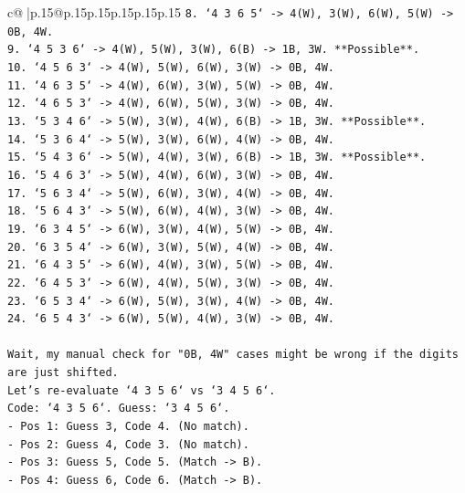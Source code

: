 \documentclass{article}
\begin{document}
{\begin{supertabular}{c@{$\;$}|p{.15\linewidth}@{}p{.15\linewidth}p{.15\linewidth}p{.15\linewidth}p{.15\linewidth}p{.15\linewidth}}
{{{\texttt{8. `4 3 6 5` {-}> 4(W), 3(W), 6(W), 5(W) {-}> 0B, 4W.} \\
\texttt{9. `4 5 3 6` {-}> 4(W), 5(W), 3(W), 6(B) {-}> 1B, 3W. **Possible**.} \\
\texttt{10. `4 5 6 3` {-}> 4(W), 5(W), 6(W), 3(W) {-}> 0B, 4W.} \\
\texttt{11. `4 6 3 5` {-}> 4(W), 6(W), 3(W), 5(W) {-}> 0B, 4W.} \\
\texttt{12. `4 6 5 3` {-}> 4(W), 6(W), 5(W), 3(W) {-}> 0B, 4W.} \\
\texttt{13. `5 3 4 6` {-}> 5(W), 3(W), 4(W), 6(B) {-}> 1B, 3W. **Possible**.} \\
\texttt{14. `5 3 6 4` {-}> 5(W), 3(W), 6(W), 4(W) {-}> 0B, 4W.} \\
\texttt{15. `5 4 3 6` {-}> 5(W), 4(W), 3(W), 6(B) {-}> 1B, 3W. **Possible**.} \\
\texttt{16. `5 4 6 3` {-}> 5(W), 4(W), 6(W), 3(W) {-}> 0B, 4W.} \\
\texttt{17. `5 6 3 4` {-}> 5(W), 6(W), 3(W), 4(W) {-}> 0B, 4W.} \\
\texttt{18. `5 6 4 3` {-}> 5(W), 6(W), 4(W), 3(W) {-}> 0B, 4W.} \\
\texttt{19. `6 3 4 5` {-}> 6(W), 3(W), 4(W), 5(W) {-}> 0B, 4W.} \\
\texttt{20. `6 3 5 4` {-}> 6(W), 3(W), 5(W), 4(W) {-}> 0B, 4W.} \\
\texttt{21. `6 4 3 5` {-}> 6(W), 4(W), 3(W), 5(W) {-}> 0B, 4W.} \\
\texttt{22. `6 4 5 3` {-}> 6(W), 4(W), 5(W), 3(W) {-}> 0B, 4W.} \\
\texttt{23. `6 5 3 4` {-}> 6(W), 5(W), 3(W), 4(W) {-}> 0B, 4W.} \\
\texttt{24. `6 5 4 3` {-}> 6(W), 5(W), 4(W), 3(W) {-}> 0B, 4W.} \\
\\ 
\texttt{Wait, my manual check for "0B, 4W" cases might be wrong if the digits are just shifted.} \\
\texttt{Let's re{-}evaluate `4 3 5 6` vs `3 4 5 6`.} \\
\texttt{Code: `4 3 5 6`. Guess: `3 4 5 6`.} \\
\texttt{{-} Pos 1: Guess 3, Code 4. (No match).} \\
\texttt{{-} Pos 2: Guess 4, Code 3. (No match).} \\
\texttt{{-} Pos 3: Guess 5, Code 5. (Match {-}> B).} \\
\texttt{{-} Pos 4: Guess 6, Code 6. (Match {-}> B).} \\
}}}
\end{supertabular}}
\end{document}
